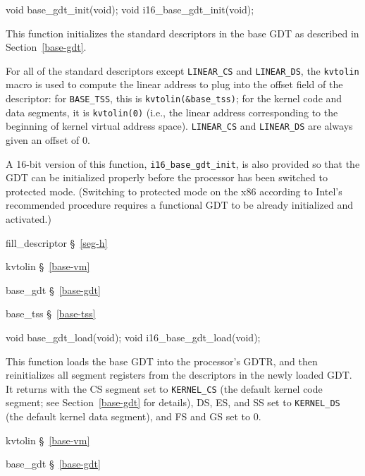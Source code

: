 \label{base-gdt-init}
\begin{apisyn}

	\funcproto void base_gdt_init(void);
	\funcproto void i16_base_gdt_init(void);
\end{apisyn}
\begin{apidesc}
	This function initializes the standard descriptors in the base GDT
	as described in Section~\ref{base-gdt}.

	For all of the standard descriptors
	except {\tt LINEAR_CS} and {\tt LINEAR_DS},
	the {\tt kvtolin} macro is used to compute
	the linear address to plug into the offset field of the descriptor:
	for {\tt BASE_TSS}, this is {\tt kvtolin(\&base_tss)};
	for the kernel code and data segments, it is {\tt kvtolin(0)}
	(i.e., the linear address corresponding to
	the beginning of kernel virtual address space).
	{\tt LINEAR_CS} and {\tt LINEAR_DS} are always given an offset of 0.

	A 16-bit version of this function, {\tt i16_base_gdt_init},
	is also provided so that the GDT can be initialized properly
	before the processor has been switched to protected mode.
	(Switching to protected mode on the x86
	according to Intel's recommended procedure
	requires a functional GDT to be already initialized and activated.)
\end{apidesc}
\begin{apidep}
	\item[fill_descriptor]	\S~\ref{seg-h}
	\item[kvtolin]		\S~\ref{base-vm}
	\item[base_gdt]		\S~\ref{base-gdt}
	\item[base_tss]		\S~\ref{base-tss}
\end{apidep}

\label{base-gdt-load}
\begin{apisyn}
	\funcproto void base_gdt_load(void);
	\funcproto void i16_base_gdt_load(void);
\end{apisyn}
\begin{apidesc}
	This function loads the base GDT into the processor's GDTR,
	and then reinitializes all segment registers
	from the descriptors in the newly loaded GDT\@.
	It returns with the CS segment set to {\tt KERNEL_CS}
	(the default kernel code segment;
	see Section~\ref{base-gdt} for details),
	DS, ES, and SS set to {\tt KERNEL_DS}
	(the default kernel data segment),
	and FS and GS set to 0.
\end{apidesc}
\begin{apidep}
	\item[kvtolin]		\S~\ref{base-vm}
	\item[base_gdt]		\S~\ref{base-gdt}
\end{apidep}

